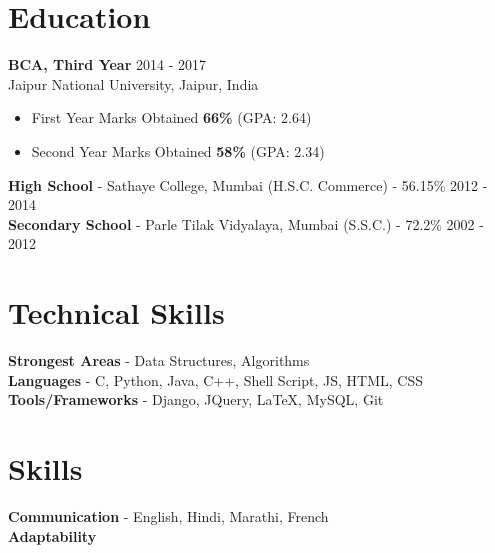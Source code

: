 \documentclass[line, margin]{res}
\begin{document}
\address{S.V.Road \\ Andheri, Mumbai 400058 \\ +91-9920945449}
 
\begin{resume}
\section{Education}
\textbf{BCA, Third Year} \hfill 2014 - 2017 \\
{Jaipur National University, Jaipur, India}
\begin{itemize}
 \item First Year Marks Obtained \textbf{66\%} (GPA: 2.64)
 \item Second Year Marks Obtained \textbf{58\%} (GPA: 2.34)
\end{itemize}
\textbf{High School} - {Sathaye College, Mumbai} (H.S.C. Commerce) - 56.15\% \hfill 2012 - 2014 \\
\textbf{Secondary School} - Parle Tilak Vidyalaya, Mumbai (S.S.C.) - 72.2\% \hfill 2002 - 2012
 
\section{Technical Skills}
\textbf{Strongest Areas} - Data Structures, Algorithms \\
\textbf{Languages} - C, Python, Java, C++, Shell Script, JS, HTML, CSS\\
\textbf{Tools/Frameworks} - Django, JQuery, \LaTeX, MySQL, Git

\section{Skills}
\textbf{Communication} - English, Hindi, Marathi, French \\
\textbf{Adaptability}
 

\end{resume}
\end{document}
